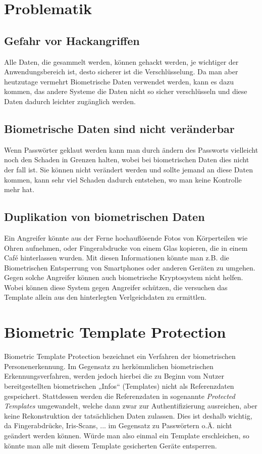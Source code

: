 \documentclass[12pt,a4paper]{article}
\begin{document}
\section{Problematik}
\subsection{Gefahr vor Hackangriffen}
Alle Daten, die gesammelt werden, können gehackt werden, je wichtiger der Anwendungsbereich ist, desto sicherer ist die Verschlüsselung. Da man aber heutzutage vermehrt Biometrische Daten verwendet werden, kann es dazu kommen, das andere Systeme die Daten nicht so sicher verschlüsseln und diese Daten dadurch leichter zugänglich werden.
\subsection{Biometrische Daten sind nicht veränderbar}
Wenn Passwörter geklaut werden kann man durch ändern des Passworts vielleicht noch den Schaden in Grenzen halten, wobei bei biometrischen Daten dies nicht der fall ist. Sie können nicht verändert werden und sollte jemand an diese Daten kommen, kann sehr viel Schaden dadurch entstehen, wo man keine Kontrolle mehr hat.
\cite{kaspersky}
\subsection{Duplikation von biometrischen Daten}
Ein Angreifer könnte aus der Ferne hochauflösende Fotos von Körperteilen wie Ohren aufnehmen, oder Fingerabdrucke von einem Glas kopieren, die in einem Café hinterlassen wurden. Mit diesen Informationen könnte man z.B. die Biometrischen Entsperrung von Smartphones oder anderen Geräten zu umgehen. Gegen solche Angreifer können auch biometrische Kryptosystem nicht helfen. Wobei können diese System gegen Angreifer schützen, die versuchen das Template allein aus den hinterlegten Verlgeichdaten zu ermittlen.
\cite{norton}
\section{Biometric Template Protection}
Biometric Template Protection bezeichnet ein Verfahren der biometrischen Personenerkennung. Im Gegensatz zu herkömmlichen biometrischen Erkennungsverfahren, werden jedoch hierbei die zu Beginn vom Nutzer bereitgestellten biometrischen „Infos“ (Templates) nicht als Referenzdaten gespeichert. Stattdessen werden die Referenzdaten in sogenannte \textit{Protected Templates} umgewandelt, welche dann zwar zur Authentifizierung ausreichen, aber keine Rekonstruktion der tatsächlichen Daten zulassen. Dies ist deshalb wichtig, da Fingerabdrücke, Iris-Scans, ... im Gegensatz zu Passwörtern o.Ä. nicht geändert werden können. Würde man also einmal ein Template erschleichen, so könnte man alle mit diesem Template gesicherten Geräte entsperren.
\end{document}
